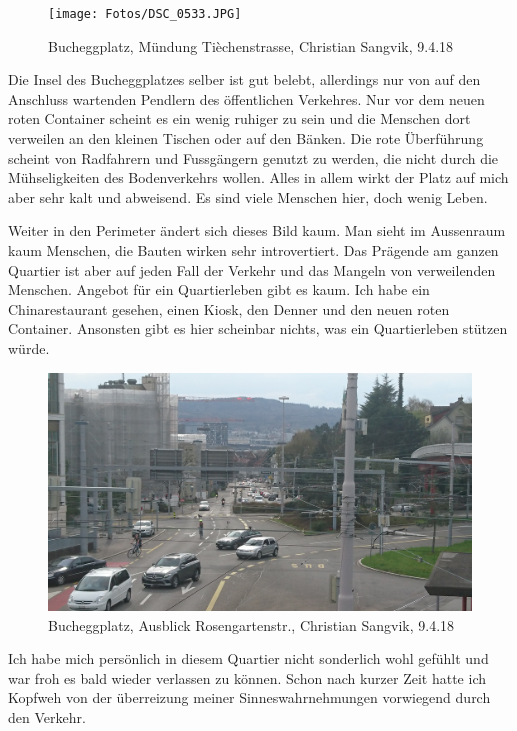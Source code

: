 \documentclass[a4paper,ngerman,11pt]{scrartcl}
\begin{document}
\begin{figure}[H]
\centering
\texttt{[image: Fotos/DSC\_0533.JPG]}
\caption{Bucheggplatz, Mündung Tièchenstrasse, Christian Sangvik, 9.4.18}
\end{figure}

Die Insel des Bucheggplatzes selber ist gut belebt, allerdings nur von auf den
Anschluss wartenden Pendlern des öffentlichen Verkehres. Nur vor dem neuen
roten Container scheint es ein wenig ruhiger zu sein und die Menschen dort
verweilen an den kleinen Tischen oder auf den Bänken. Die rote Überführung
scheint von Radfahrern und Fussgängern genutzt zu werden, die nicht durch die
Mühseligkeiten des Bodenverkehrs wollen. Alles in allem wirkt der Platz auf
mich aber sehr kalt und abweisend. Es sind viele Menschen hier, doch wenig
Leben.

Weiter in den Perimeter ändert sich dieses Bild kaum. Man sieht im Aussenraum
kaum Menschen, die Bauten wirken sehr introvertiert. Das Prägende am ganzen
Quartier ist aber auf jeden Fall der Verkehr und das Mangeln von verweilenden
Menschen. Angebot für ein Quartierleben gibt es kaum. Ich habe ein
Chinarestaurant gesehen, einen Kiosk, den Denner und den neuen roten
Container. Ansonsten gibt es hier scheinbar nichts, was ein Quartierleben
stützen würde.

\begin{figure}[H]
\centering
\includegraphics[width=\textwidth]{Fotos/DSC_0555.JPG}
\caption{Bucheggplatz, Ausblick Rosengartenstr., Christian Sangvik, 9.4.18}
\end{figure}

Ich habe mich persönlich in diesem Quartier nicht sonderlich wohl gefühlt und
war froh es bald wieder verlassen zu können. Schon nach kurzer Zeit hatte ich
Kopfweh von der überreizung meiner Sinneswahrnehmungen vorwiegend durch den
Verkehr.
\end{document}
